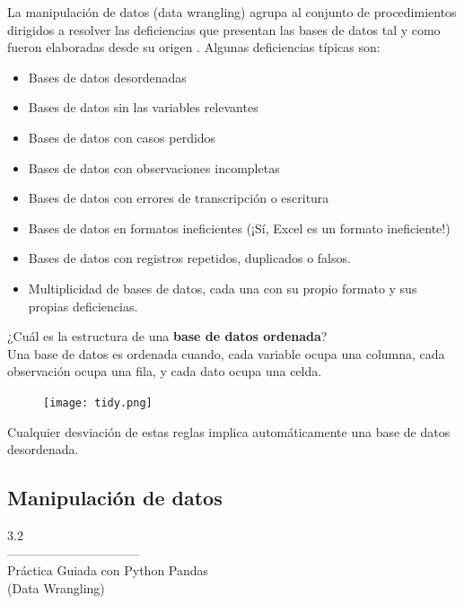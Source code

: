 \documentclass[aspectratio=169]{beamer}
\begin{document}
\begin{frame}
La manipulación de datos (data wrangling) agrupa al conjunto de procedimientos dirigidos a resolver las deficiencias que presentan las bases de datos tal y como fueron elaboradas desde su origen \cite{Shmueli2020}. Algunas deficiencias típicas son:
\begin{itemize}
\item Bases de datos desordenadas
\item Bases de datos sin las variables relevantes
\item Bases de datos con casos perdidos
\item Bases de datos con observaciones incompletas
\item Bases de datos con errores de transcripción o escritura
\item Bases de datos en formatos ineficientes (¡Sí, Excel es un formato ineficiente!)
\item Bases de datos con registros repetidos, duplicados o falsos.
\item Multiplicidad de bases de datos, cada una con su propio formato y sus propias deficiencias.
\end{itemize}
\end{frame}

\begin{frame}
¿Cuál es la estructura de una \textbf{base de datos ordenada}?\\
\vspace{0.5cm}
Una base de datos es ordenada cuando, cada variable ocupa una columna, cada observación  ocupa una fila, y cada dato ocupa una celda.
\begin{figure}
\centering
 \texttt{[image: tidy.png]}
\end{figure}
Cualquier desviación de estas reglas implica automáticamente una base de datos desordenada.
\end{frame}

\subsection{Manipulación de datos}
\begin{frame}
\begin{center}
\Huge
\textcolor{azulcesaclaro}{3.2\\
--------------------------------\\
Práctica Guiada con Python Pandas\\
(Data Wrangling)}
\end{center}
\end{frame}
\end{document}
